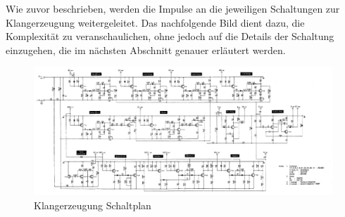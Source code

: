 Wie zuvor beschrieben, werden die Impulse an die jeweiligen Schaltungen zur Klangerzeugung weitergeleitet. Das nachfolgende Bild dient dazu, die Komplexität zu veranschaulichen, ohne jedoch auf die Details der Schaltung einzugehen, die im nächsten Abschnitt genauer erläutert werden.

\begin{figure}[H]
    \centering
    \includegraphics[width=1\textwidth]{Images/RC.png}
    \caption[Klangerzeugung Schaltplan]{Klangerzeugung Schaltplan \cite{ServiceManual}}
    
    \label{fig:Klangerzeugung Schaltplan}
\end{figure}
